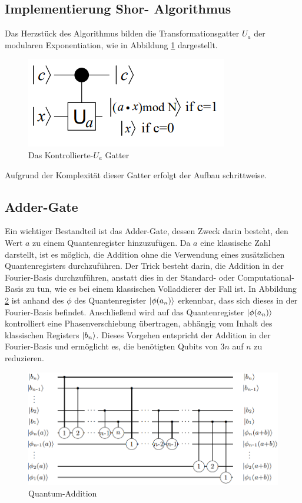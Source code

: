 \documentclass[
	a4paper, %
	10pt, %
	unnumberedsections, %
	twoside, %
]{LTJournalArticle}
\begin{document}
\subsection{\Large Implementierung Shor- Algorithmus}
Das Herzstück des Algorithmus bilden die Transformationsgatter $U_a$ der modularen Exponentiation, wie in Abbildung \ref{fig:c-Ugate} dargestellt.
\begin{figure}[h]
\caption{Das Kontrollierte-$U_a$ Gatter\autocite{beauregard2003circuit}}
\label{fig:c-Ugate}
\includegraphics[scale=0.8]{c-Ugate.PNG}
\centering
\end{figure}
Aufgrund der Komplexität dieser Gatter erfolgt der Aufbau schrittweise.
\subsection{\large Adder-Gate}
Ein wichtiger Bestandteil ist das Adder-Gate, dessen Zweck darin besteht, den Wert $a$ zu einem Quantenregister hinzuzufügen. Da $a$ eine klassische Zahl darstellt, ist es möglich, die Addition ohne die Verwendung eines zusätzlichen Quantenregisters durchzuführen. Der Trick besteht darin, die Addition in der Fourier-Basis durchzuführen, anstatt dies in der Standard- oder Computational-Basis zu tun, wie es bei einem klassischen Volladdierer der Fall ist. In Abbildung \ref{fig:Quantum-Addition} ist anhand des $\phi$ des Quantenregister $\ket{\phi(a_n)}$  erkennbar, dass sich dieses in der Fourier-Basis befindet.
Anschließend wird auf das Quantenregister $\ket{\phi(a_n)}$ kontrolliert eine Phasenverschiebung übertragen, abhängig vom Inhalt des klassischen Registers $\ket{b_n}$. Dieses Vorgehen entspricht der Addition in der Fourier-Basis und ermöglicht es, die benötigten Qubits von $3n$ auf $n$ zu reduzieren.
\begin{figure}[h]
\caption{Quantum-Addition\autocite{draper2000addition}}
\label{fig:Quantum-Addition}
\includegraphics[scale=0.4]{Quantum-Addition.PNG}
\centering
\end{figure}
\end{document}
